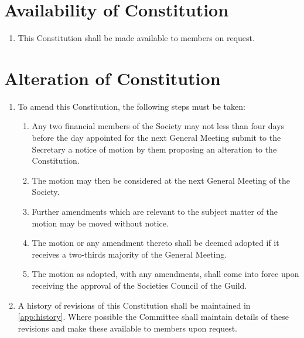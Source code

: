 \documentclass[a4paper]{article}
\newenvironment{enumsection}[1]{\section{#1} \begin{enumerate}[ref=\thesection.\theenumi]}{\end{enumerate}}
\begin{document}
\begin{enumsection}{Availability of Constitution}
	\item This Constitution shall be made available to members on request.
\end{enumsection}


\begin{enumsection}{Alteration of Constitution}
    \item To amend this Constitution, the following steps must be taken:
    \begin{enumerate}
        \item Any two financial members of the Society may not less than four days before the day appointed for the next General Meeting submit to the Secretary a notice of motion by them proposing an alteration to the Constitution.
        \item The motion may then be considered at the next General Meeting of the Society.
        \item Further amendments which are relevant to the subject matter of the motion may be moved without notice.
        \item The motion or any amendment thereto shall be deemed adopted if it receives a two-thirds majority of the General Meeting.
        \item The motion as adopted, with any amendments, shall come into force upon receiving the approval of the Societies Council of the Guild.
    \end{enumerate}
    \item A history of revisions of this Constitution shall be maintained in \cref{app:history}. Where possible the Committee shall maintain details of these revisions and make these available to members upon request.
\end{enumsection}
\end{document}
